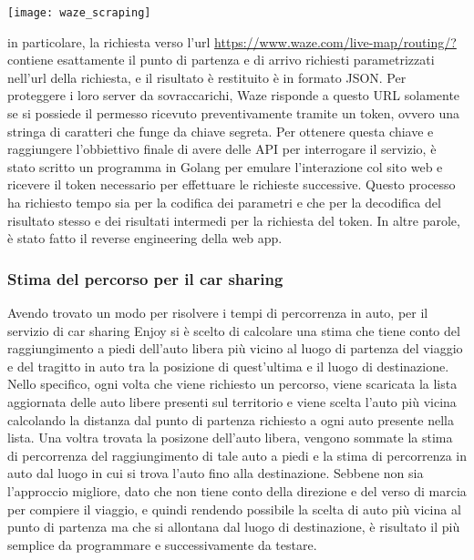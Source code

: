 \begin{center}
	\texttt{[image: waze\_scraping]}
\end{center}

in particolare, la richiesta verso l'url \url{https://www.waze.com/live-map/routing/?} contiene esattamente il punto di partenza e di arrivo richiesti parametrizzati nell'url della richiesta, e il risultato è restituito è in formato JSON. Per proteggere i loro server da sovraccarichi, Waze risponde a questo URL solamente se si possiede il permesso ricevuto preventivamente tramite un token, ovvero una stringa di caratteri che funge da chiave segreta. Per ottenere questa chiave e raggiungere l'obbiettivo finale di avere delle API per interrogare il servizio, è stato scritto un programma in Golang per emulare l'interazione col sito web e ricevere il token necessario per effettuare le richieste successive. Questo processo ha richiesto tempo sia per la codifica dei parametri e che per la decodifica del risultato stesso e dei risultati intermedi per la richiesta del token. In altre parole, è stato fatto il reverse engineering della web app.

\subsubsection{Stima del percorso per il car sharing}

Avendo trovato un modo per risolvere i tempi di percorrenza in auto, per il servizio di car sharing Enjoy si è scelto di calcolare una stima che tiene conto del raggiungimento a piedi dell'auto libera più vicino al luogo di partenza del viaggio e del tragitto in auto tra la posizione di quest'ultima e il luogo di destinazione. Nello specifico, ogni volta che viene richiesto un percorso, viene scaricata la lista aggiornata delle auto libere presenti sul territorio e viene scelta l'auto più vicina calcolando la distanza dal punto di partenza richiesto a ogni auto presente nella lista. Una voltra trovata la posizone dell'auto libera, vengono sommate la stima di percorrenza del raggiungimento di tale auto a piedi e la stima di percorrenza in auto dal luogo in cui si trova l'auto fino alla destinazione. Sebbene non sia l'approccio migliore, dato che non tiene conto della direzione e del verso di marcia per compiere il viaggio, e quindi rendendo possibile la scelta di auto più vicina al punto di partenza ma che si allontana dal luogo di destinazione, è risultato il più semplice da programmare e successivamente da testare.

